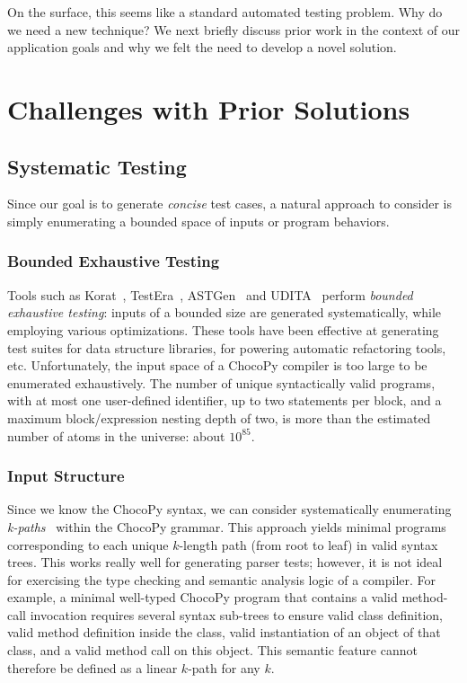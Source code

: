 \documentclass[conference]{IEEEtran}
\begin{document}
On the surface, this seems like a standard automated testing problem. Why do we need a new technique? We next briefly discuss prior work in the context of our application goals and why we felt the need to develop a novel solution.
 
\section{Challenges with Prior Solutions}
\label{sec:related}

\subsection{Systematic Testing}

Since our goal is to generate \emph{concise} test cases, a  natural approach to consider is simply enumerating a bounded space of inputs or program behaviors.

\subsubsection{Bounded Exhaustive Testing}

Tools such as Korat~\cite{Boyapati02}, TestEra~\cite{Khurshid04}, ASTGen~\cite{Daniel07} and UDITA~\cite{Gligoric10} perform \emph{bounded exhaustive testing}: inputs of a bounded size are generated systematically, while employing various optimizations. These tools have been effective at generating test suites for data structure libraries, for powering automatic refactoring tools, etc. Unfortunately, the input space of a ChocoPy compiler is too large to be enumerated exhaustively. The number of unique syntactically valid programs, with at most one user-defined identifier, up to two statements per block, and a maximum block/expression nesting depth of two, is more than the estimated number of atoms in the universe: about $10^{85}$.

\subsubsection{Input Structure}

Since we know the ChocoPy syntax, we can consider systematically enumerating \emph{k-paths}~\cite{Havrikov19} within the ChocoPy grammar. This approach yields minimal programs corresponding to each unique $k$-length path (from root to leaf) in valid syntax trees. This works really well for generating parser tests; however, it is not ideal for exercising the type checking and semantic analysis logic of a compiler. For example, a minimal well-typed ChocoPy program that contains a valid method-call invocation requires several syntax sub-trees to ensure valid class definition, valid method definition inside the class, valid instantiation of an object of that class, and a valid method call on this object. This semantic feature cannot therefore be defined as a linear $k$-path for any $k$. 
\end{document}

